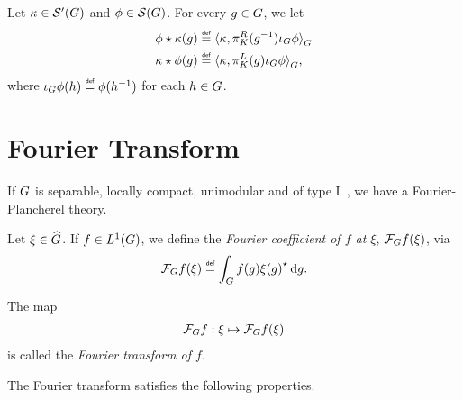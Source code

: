 \begin{definition}[Convolution]
    Let $\kappa \in {\mathcal{S}' (G)}$ and $\phi \in {\mathcal{S} (G)}$.
    For every $g \in G$,
    we let
    \begin{align*}
        \conv \phi \kappa(g) &\defeq \dualBracket [\Group] \kappa {\RightRegularRepresentation(g^{-1}) \InverseFunctionArgument \phi}\\
        \conv \kappa \phi(g) &\defeq \dualBracket [\Group] \kappa {\LeftRegularRepresentation(g) \InverseFunctionArgument \phi},
    \end{align*}
    where $\InverseFunctionArgument \phi(h) \defeq \phi(h^{-1})$ for each $h \in G$.
\end{definition}

\section{Fourier Transform}

If $G$ is separable, locally compact, unimodular and of type I~\cite{FischerRuzhansky16},
we have a Fourier-Plancherel theory.

\begin{definition}
\label{definition:Fourier_coefficient}
    Let $\xi \in {\widehat{G}}$.
    If $f \in {L^{1} (G)}$,
    we define the \emph{Fourier coefficient of $f$ at $\xi$}, $\mathcal{F}_{G} f(\xi)$, via
    \begin{align}
        \Fourier f(\xi) \defeq \int_\Group f(g) \adj{\xi(g)} \dd g.
        \label{eq:definition_of_Fourier_coefficient}
    \end{align}

    The map
    \begin{align*}
        \mathcal{F}_{G} f : \xi \mapsto \mathcal{F}_{G} f(\xi)
    \end{align*}
    is called the \emph{Fourier transform of $f$}.
\end{definition}

The Fourier transform satisfies the following properties.

